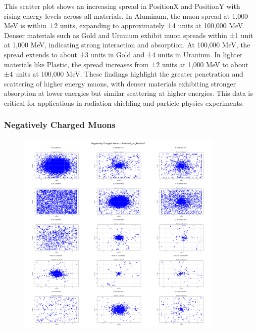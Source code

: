 \documentclass{article}
\begin{document}
\noindent This scatter plot shows an increasing spread in PositionX and PositionY with rising energy levels across all materials. In Aluminum, the muon spread at 1,000 MeV is within ±2 units, expanding to approximately ±4 units at 100,000 MeV. Denser materials such as Gold and Uranium exhibit muon spreads within ±1 unit at 1,000 MeV, indicating strong interaction and absorption. At 100,000 MeV, the spread extends to about ±3 units in Gold and ±4 units in Uranium. In lighter materials like Plastic, the spread increases from ±2 units at 1,000 MeV to about ±4 units at 100,000 MeV. These findings highlight the greater penetration and scattering of higher energy muons, with denser materials exhibiting stronger absorption at lower energies but similar scattering at higher energies. This data is critical for applications in radiation shielding and particle physics experiments.

\subsubsection{Negatively Charged Muons}

\begin{figure}[H]
\centering
\includegraphics[width=0.9\textwidth]{images/Combined Plots/PositionX_vs_PositionY_mu-.png}
\end{figure}\
\end{document}
